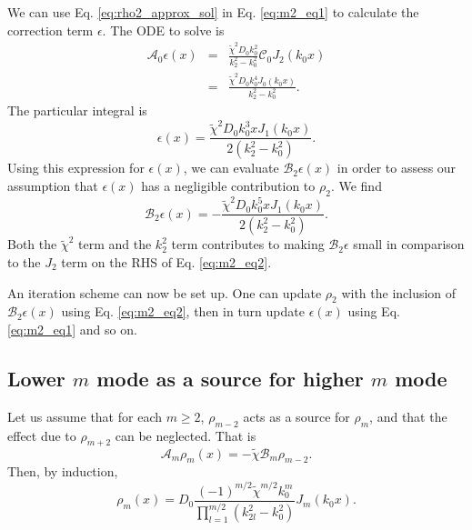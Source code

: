 \documentclass[useAMS,8pt,twocolumn]{article}
\newcommand{\beq}{\begin{equation}}
\newcommand{\eeq}{\end{equation}}
\newcommand{\beqn}{\begin{eqnarray}}
\newcommand{\eeqn}{\end{eqnarray}}
\begin{document}
We can use Eq. \ref{eq:rho2_approx_sol} in Eq. \ref{eq:m2_eq1} to
calculate the correction term $\epsilon$. The ODE to solve is
\beqn
\mathcal{A}_0\epsilon(x)
&=&\frac{\tilde{\chi}^2D_0k_0^2}{k_2^2-k_0^2}\mathcal{C}_0J_2(k_0x) \nonumber \\ 
&=&\frac{\tilde{\chi}^2D_0k_0^4J_0(k_0x)}{k_2^2-k_0^2}.
\eeqn
The particular integral is 
\beq
\epsilon(x) = \frac{\tilde{\chi}^2D_0k_0^3xJ_1(k_0x)}{2\left(k_2^2 -
  k_0^2\right)}. 
\eeq
Using this expression for $\epsilon(x)$, we can evaluate
$\mathcal{B}_2\epsilon(x)$ in order to assess our assumption that
$\epsilon(x)$ has a negligible contribution to $\rho_2$. We find
\beq
\mathcal{B}_2\epsilon(x) =
-\frac{\tilde{\chi}^2D_0k_0^5xJ_1(k_0x)}{2\left(k_2^2 -
  k_0^2\right)}. 
\eeq
Both the $\tilde{\chi}^2$ term and the $k_2^2$ term contributes to
making $\mathcal{B}_2\epsilon$ small in comparison to the $J_2$ term
on the RHS of Eq. \ref{eq:m2_eq2}. 

An iteration scheme can now be set up. One can update
$\rho_2$ with the inclusion of $\mathcal{B}_2\epsilon(x)$ using
Eq. \ref{eq:m2_eq2}, then in turn update $\epsilon(x)$ using
Eq. \ref{eq:m2_eq1} and so on. 


\subsection{Lower $m$ mode as a source for higher $m$ mode}
Let us assume that for each $m\geq2$, $\rho_{m-2}$ acts as a source
for $\rho_{m}$, and that the effect due to $\rho_{m+2}$ can be
neglected. That is
\beq
\mathcal{A}_m\rho_m(x) = -\tilde{\chi}\mathcal{B}_m\rho_{m-2}. 
\eeq 
Then, by induction,
\beq
\rho_m(x) =D_0
\frac{(-1)^{m/2}\tilde{\chi}^{m/2}k_0^m}{\prod_{l=1}^{m/2}(k_{2l}^2-k_0^2)}J_m(k_0x). 
\eeq
\end{document}
